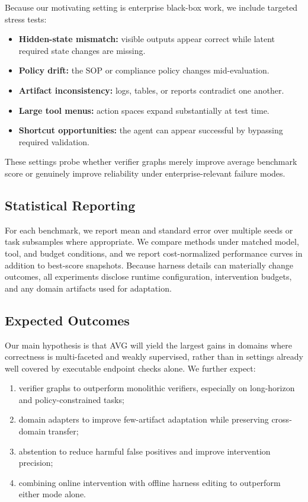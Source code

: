 \documentclass{article} %
\newcommand{\AVG}{\textsc{AVG}\xspace}
\begin{document}
Because our motivating setting is enterprise black-box work, we include targeted stress tests:
\begin{itemize}[leftmargin=1.2em]
    \item \textbf{Hidden-state mismatch:} visible outputs appear correct while latent required state changes are missing.
    \item \textbf{Policy drift:} the SOP or compliance policy changes mid-evaluation.
    \item \textbf{Artifact inconsistency:} logs, tables, or reports contradict one another.
    \item \textbf{Large tool menus:} action spaces expand substantially at test time.
    \item \textbf{Shortcut opportunities:} the agent can appear successful by bypassing required validation.
\end{itemize}
These settings probe whether verifier graphs merely improve average benchmark score or genuinely improve reliability under enterprise-relevant failure modes.

\subsection{Statistical Reporting}
\label{subsec:stats}

For each benchmark, we report mean and standard error over multiple seeds or task subsamples where appropriate. We compare methods under matched model, tool, and budget conditions, and we report cost-normalized performance curves in addition to best-score snapshots. Because harness details can materially change outcomes, all experiments disclose runtime configuration, intervention budgets, and any domain artifacts used for adaptation.

\subsection{Expected Outcomes}
\label{subsec:expected}

Our main hypothesis is that \AVG will yield the largest gains in domains where correctness is multi-faceted and weakly supervised, rather than in settings already well covered by executable endpoint checks alone. We further expect:
\begin{enumerate}[leftmargin=1.3em]
    \item verifier graphs to outperform monolithic verifiers, especially on long-horizon and policy-constrained tasks;
    \item domain adapters to improve few-artifact adaptation while preserving cross-domain transfer;
    \item abstention to reduce harmful false positives and improve intervention precision;
    \item combining online intervention with offline harness editing to outperform either mode alone.
\end{enumerate}
\end{document}
